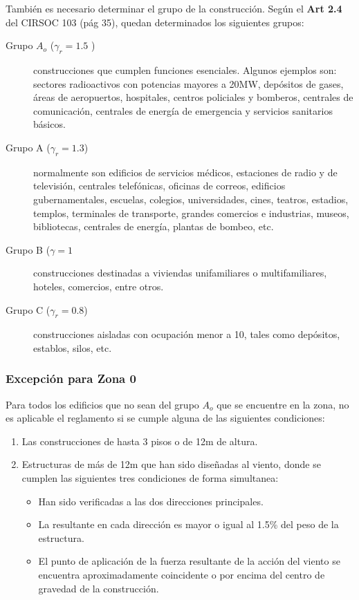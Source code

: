 \documentclass[../main.tex]{subfiles}
\begin{document}
También es necesario determinar el grupo de la construcción. Según el \textbf{Art 2.4}
del CIRSOC 103 (pág 35), quedan determinados los siguientes grupos:

\begin{description}
  \item[Grupo $A_o$ ($\gamma_r = 1.5$ )]  construcciones que cumplen funciones 
    esenciales. Algunos ejemplos son: sectores radioactivos con potencias 
    mayores a 20MW, depósitos de gases, áreas de aeropuertos, hospitales, 
    centros policiales y bomberos, centrales de comunicación, centrales de 
    energía de emergencia y servicios sanitarios básicos.
  \item[Grupo A ($\gamma_r = 1.3$)] normalmente son edificios de servicios médicos,
    estaciones de radio y de televisión, centrales telefónicas, oficinas de
    correos, edificios gubernamentales, escuelas, colegios, universidades,
    cines, teatros, estadios, templos, terminales de transporte, grandes 
    comercios e industrias, museos, bibliotecas, centrales de energía, plantas
    de bombeo, etc.
  \item[Grupo B ($\gamma = 1$] construcciones destinadas a viviendas unifamiliares
    o multifamiliares, hoteles, comercios, entre otros.
  \item[Grupo C ($\gamma_r = 0.8$)] construcciones aisladas con ocupación menor a 10,
    tales como depósitos, establos, silos, etc.
\end{description}

\subsubsection{Excepción para Zona 0}

Para todos los edificios que no sean del grupo $A_o$ que se encuentre en la 
zona, no es aplicable el reglamento si se cumple alguna de las siguientes
condiciones:

 \begin{enumerate}
  \item Las construcciones de hasta 3 pisos o de 12m de altura.
  \item Estructuras de más de 12m que han sido diseñadas al viento, donde
    se cumplen las siguientes tres condiciones de forma simultanea:
    
    \begin{itemize}
      \item Han sido verificadas a las dos direcciones principales.
      \item La resultante en cada dirección es mayor o igual al 1.5\% del peso
        de la estructura.
       \item El punto de aplicación de la fuerza resultante de la acción del
         viento se encuentra aproximadamente coincidente o por encima del 
         centro de gravedad de la construcción.
    \end{itemize}
\end{enumerate}
\end{document}
